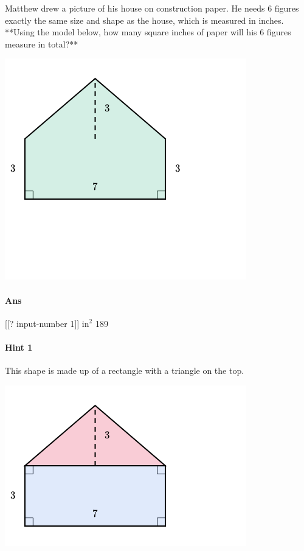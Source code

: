 \documentclass[twocolumn,10pt]{article}
\def\shrinkfactor{0.55}
\begin{document}
\noindent
Matthew drew a picture of his house on construction paper.  He needs $6$ figures exactly the same size and shape as the house, which is measured in inches. **Using the model below, how many square inches of paper will his $6$ figures measure in total?**    


\includegraphics[scale=\shrinkfactor]{figures/2e4ce4191b4fc38f257d0fa2cf77a91ef947d85e.png}

\paragraph{Ans}  [[? input-number 1]] $\text{in}^2$  189

\paragraph{Hint 1}This shape is made up of a rectangle with a triangle on the top.   


\includegraphics[scale=\shrinkfactor]{figures/31c1e6aea80c6123a5e9b4a17051aa39258832da.png}  
\end{document}
